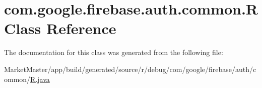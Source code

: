 \hypertarget{classcom_1_1google_1_1firebase_1_1auth_1_1common_1_1R}{}\section{com.\+google.\+firebase.\+auth.\+common.\+R Class Reference}
\label{classcom_1_1google_1_1firebase_1_1auth_1_1common_1_1R}


The documentation for this class was generated from the following file\+:\begin{DoxyCompactItemize}
\item 
Market\+Master/app/build/generated/source/r/debug/com/google/firebase/auth/common/\mbox{\hyperlink{debug_2com_2google_2firebase_2auth_2common_2R_8java}{R.\+java}}\end{DoxyCompactItemize}
